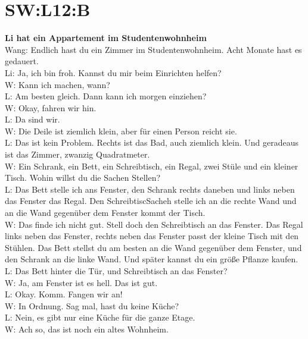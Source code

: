 \section{SW:L12:B}
\textbf{Li hat ein Appartement im Studentenwohnheim} \\
Wang: Endlich hast du ein Zimmer im Studentenwohnheim. Acht Monate hast es gedauert. \\
Li: Ja, ich bin froh.  Kannst du mir beim Einrichten helfen? \\
W: Kann ich machen, wann? \\
L: Am besten gleich. Dann kann ich morgen einziehen? \\
W: Okay, fahren wir hin. \\
L: Da sind wir. \\
W: Die Deile ist ziemlich klein,  aber für einen Person reicht sie.  \\
L: Das ist kein Problem. Rechts ist das Bad, auch ziemlich klein.
Und geradeaus ist das Zimmer, zwanzig Quadratmeter.  \\
W: Ein Schrank, ein Bett, ein Schreibtisch, ein Regal, zwei Stüle und ein kleiner Tisch.
Wohin willst du die Sachen Stellen?  \\
L: Das Bett stelle ich ans Fenster, den Schrank rechts daneben 
und links neben das Fenster das Regal. Den SchreibtiscSacheh stelle ich an die rechte Wand und an die Wand gegenüber dem Fenster kommt der Tisch. \\
W: Das finde ich nicht gut. Stell doch den Schreibtisch an das Fenster.
Das Regal links neben das Fenster, rechts neben das Fenster passt der kleine Tisch mit den Stühlen. 
Das Bett stellst du am besten an die Wand gegenüber dem Fenster, und den Schrank an die linke Wand.
Und später kannst du ein größe Pflanze kaufen. \\
L: Das Bett hinter die Tür, und Schreibtisch an das Fenster? \\
W: Ja, am Fenster ist es hell. Das ist gut. \\
L: Okay. Komm. Fangen wir an! \\
W: In Ordnung. Sag mal, hast du keine Küche?  \\
L: Nein, es gibt nur eine Küche für die ganze Etage.  \\
W: Ach so, das ist noch ein altes Wohnheim. \\

